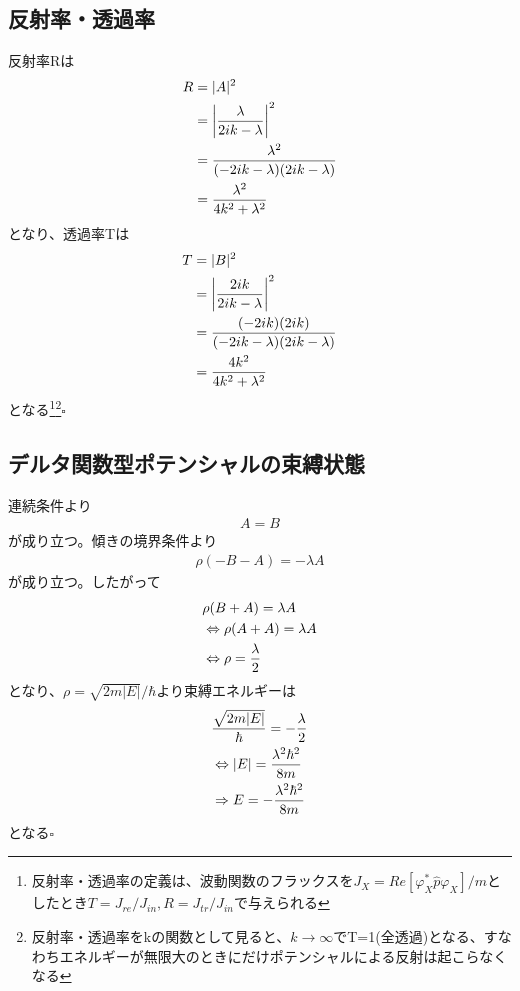\documentclass{jsarticle}  %
\numberwithin{equation}{section} %
\numberwithin{figure}{section}
\begin{document}
\subsection{反射率・透過率}
    反射率Rは
    \begin{align}
        R &= |A|^2 \notag \\
        &= \left| \frac{\lambda}{2ik - \lambda} \right|^2 \notag \\
        &= \frac{\lambda^2}{(-2ik - \lambda)(2ik - \lambda)} \notag\\
        &= \frac{\lambda^2}{4k^2 + \lambda^2}
    \end{align}
    となり、透過率Tは
    \begin{align}
        T &= |B|^2 \notag \\
        &= \left| \frac{2ik}{2ik - \lambda} \right|^2 \notag \\
        &= \frac{(-2ik)(2ik)}{(-2ik - \lambda)(2ik - \lambda)} \notag \\
        &= \frac{4k^2}{4k^2 + \lambda^2}
    \end{align}
    となる\footnote{反射率・透過率の定義は、波動関数のフラックスを$J_X = Re[\varphi_X^*\hat{p}\varphi_X]/m$としたとき$T=J_{re} / J_{in},R = J_{tr}/J_{in}$で与えられる}\footnote{反射率・透過率をkの関数として見ると、$k\rightarrow \infty$でT=1(全透過)となる、すなわちエネルギーが無限大のときにだけポテンシャルによる反射は起こらなくなる}$\square$
\subsection{デルタ関数型ポテンシャルの束縛状態}
    連続条件より
    \begin{align}
        A = B
    \end{align}
    が成り立つ。傾きの境界条件より
    \begin{align}
        \rho (-B - A) = -\lambda A
    \end{align}
    が成り立つ。したがって
    \begin{align}
        &\rho (B + A) = \lambda A \notag \\
        &\Leftrightarrow \rho (A + A) = \lambda A \notag \\
        &\Leftrightarrow  \rho = \frac{\lambda}{2}
    \end{align}
    となり、$\rho = \sqrt{2m|E|}/\hbar$より束縛エネルギーは
    \begin{align}
        &\frac{\sqrt{2m|E|}}{\hbar} = -\frac{\lambda}{2} \notag \\
        &\Leftrightarrow |E| = \frac{\lambda^2 \hbar^2}{8m} \notag \\
        &\Rightarrow E = -\frac{\lambda^2 \hbar^2}{8m}
    \end{align}
    となる$\square$
\end{document}
